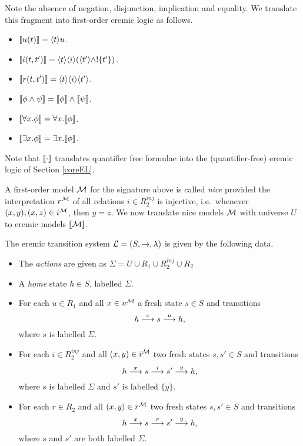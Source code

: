 \NI Note the absence of negation, disjunction, implication and
equality. We translate this fragment into first-order eremic logic as
follows.
\begin{itemize}

\item $\lbrack\!\lbrack u(t) \rbrack\!\rbrack = \langle t \rangle u$.

\item $\lbrack\!\lbrack i(t, t') \rbrack\!\rbrack = \langle t \rangle \langle i \rangle (\langle t' \rangle \land !\{t'\})$.

\item $\lbrack\!\lbrack r(t, t') \rbrack\!\rbrack = \langle t \rangle \langle i \rangle \langle t' \rangle$.

\item $\lbrack\!\lbrack \phi \land \psi \rbrack\!\rbrack = \lbrack\!\lbrack \phi \rbrack\!\rbrack \land \lbrack\!\lbrack \psi \rbrack\!\rbrack$.

\item $\lbrack\!\lbrack \forall x.\phi \rbrack\!\rbrack = \forall x.\lbrack\!\lbrack \phi \rbrack\!\rbrack$.

\item $\lbrack\!\lbrack \exists x.\phi \rbrack\!\rbrack = \exists x.\lbrack\!\lbrack \phi \rbrack\!\rbrack$.

\end{itemize}

\NI Note that $\lbrack\!\lbrack \cdot \rbrack\!\rbrack$ translates quantifier free formulae into
the (quantifier-free) eremic logic of Section \ref{coreEL}.

A first-order model $\mathcal{M}$ for the signature above is called
\emph{nice} provided the interpretation $r^{\mathcal{M}}$ of all relations
$i \in R_2^{inj}$ is injective, i.e.~whenever $(x, y), (x, z) \in
i^{\mathcal{M}}$, then $y = z$. We now translate nice models $\mathcal{M}$
with universe $U$ to eremic models $\lbrack\!\lbrack \mathcal{M} \rbrack\!\rbrack$.

The eremic transition system $\mathcal{L} = (S, \rightarrow, \lambda)$ is given by
the following data.
\begin{itemize}

\item The \emph{actions} are given as $\Sigma = U \cup R_1 \cup
  R_2^{inj} \cup R_2$

\item A \emph{home} state $h \in S$, labelled $\Sigma$.

\item For each $u \in R_1$ and all $x \in u^{\mathcal{M}}$ a fresh state
  $s \in S$ and transitions
\[
   h \stackrel{x}{\longrightarrow} s \stackrel{u}{\longrightarrow} h,
\]
where $s$ is labelled $\Sigma$.

\item For each $i \in R_2^{inj}$ and all $(x, y)  \in
i^{\mathcal{M}}$ two fresh states $s, s' \in S$ and transitions
\[
   h \stackrel{x}{\longrightarrow} s \stackrel{i}{\longrightarrow} s' \stackrel{y}{\longrightarrow} h,
\]
where $s$ is labelled $\Sigma$ and $s'$ is labelled $\{y\}$.

\item For each $r \in R_2$ and all $(x, y)  \in                                                                         
r^{\mathcal{M}}$ two fresh states $s, s' \in S$ and transitions
\[
   h \stackrel{x}{\longrightarrow} s \stackrel{r}{\longrightarrow} s' \stackrel{y}{\longrightarrow} h,
\]
where $s$ and $s'$ are both labelled $\Sigma$.

\end{itemize}

